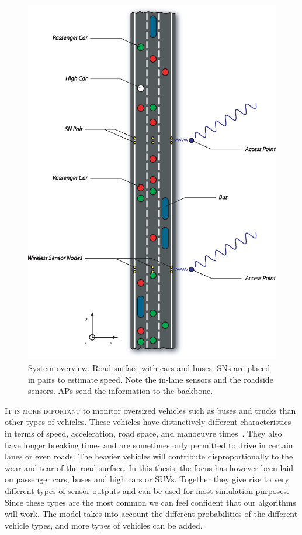 \begin{figure}[!f]
\centering
  \begin{minipage}{1\linewidth}
  \centering
   \includegraphics[width=1\linewidth]{images/roadwTraffic}
  \caption[System overview]{System overview. Road surface with cars and buses. SNs are placed in pairs to estimate speed. Note the in-lane sensors and the roadside sensors. APs send the information to the backbone.}
  \label{fig-road}
  \end{minipage}
\end{figure}

\textsc{It is more important} to monitor oversized vehicles such as buses and trucks than other types of vehicles. These vehicles have distinctively different characteristics in terms of speed, acceleration, road space, and manoeuvre times~\cite{sun2000}. They also have longer breaking times and are sometimes only permitted to drive in certain lanes or even roads. The heavier vehicles will contribute disproportionally to the wear and tear of the road surface. In this thesis, the focus has however been laid on passenger cars, buses and high cars or SUVs. Together they give rise to very different types of sensor outputs and can be used for most simulation purposes. Since these types are the most common we can feel confident that our algorithms will work. The model takes into account the different probabilities of the different vehicle types, and more types of vehicles can be added.

